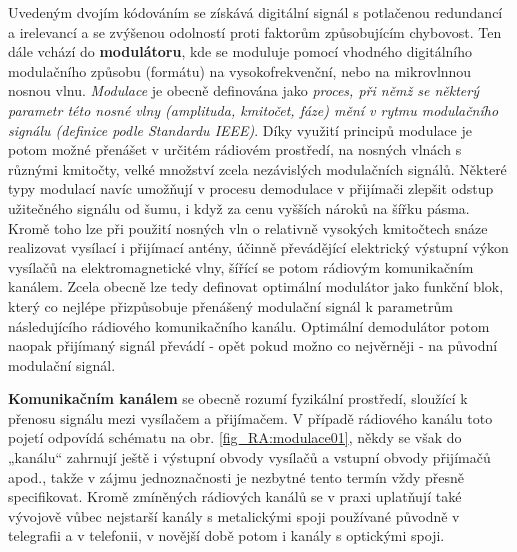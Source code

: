     Uvedeným dvojím kódováním se získává digitální signál s potlačenou redundancí a irelevancí a se zvýšenou 
    odolností proti faktorům způsobujícím chybovost. Ten dále vchází do \textbf{modulátoru}, kde se moduluje 
    pomocí vhodného digitálního modulačního způsobu (formátu) na vysokofrekvenční, nebo na mikrovlnnou nosnou 
    vlnu. \emph{Modulace} je obecně definována jako \emph{proces, při němž se některý parametr této nosné 
    vlny (amplituda, kmitočet, fáze) mění v rytmu modulačního signálu (definice podle Standardu IEEE)}. Díky 
    využití principů modulace je potom možné přenášet v určitém rádiovém prostředí, na nosných vlnách s 
    různými kmitočty, velké množství zcela nezávislých modulačních signálů. Některé typy modulací navíc 
    umožňují v procesu demodulace v přijímači zlepšit odstup užitečného signálu od šumu, i když za cenu 
    vyšších nároků na šířku pásma. Kromě toho lze při použití nosných vln o relativně vysokých kmitočtech 
    snáze realizovat vysílací i přijímací antény, účinně převádějící elektrický výstupní výkon vysílačů na 
    elektromagnetické vlny, šířící se potom rádiovým komunikačním kanálem. Zcela obecně lze tedy definovat 
    optimální modulátor jako funkční blok, který co nejlépe přizpůsobuje přenášený modulační signál k 
    parametrům následujícího rádiového komunikačního kanálu. Optimální demodulátor potom naopak přijímaný 
    signál převádí - opět pokud možno co nejvěrněji - na původní modulační signál.
    
    \textbf{Komunikačním kanálem} se obecně rozumí fyzikální prostředí, sloužící k přenosu signálu mezi 
    vysílačem a přijímačem. V případě rádiového kanálu toto pojetí odpovídá schématu na obr. 
    \ref{fig_RA:modulace01}, někdy se však do „kanálu“ zahrnují ještě i výstupní obvody vysílačů a vstupní 
    obvody přijímačů apod., takže v zájmu jednoznačnosti je nezbytné tento termín vždy přesně specifikovat. 
    Kromě zmíněných rádiových kanálů se v praxi uplatňují také vývojově vůbec nejstarší kanály s metalickými 
    spoji používané původně v telegrafii a v telefonii, v novější době potom i kanály s optickými spoji.
    
